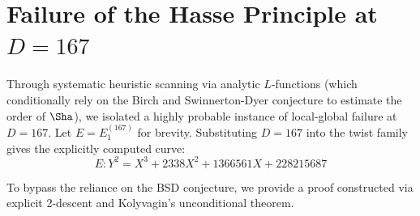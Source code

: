 \documentclass[11pt,a4paper]{article}
\begin{document}
\section{Failure of the Hasse Principle at \texorpdfstring{$D=167$}{D=167}}

Through systematic heuristic scanning via analytic $L$-functions (which conditionally rely on the Birch and Swinnerton-Dyer conjecture to estimate the order of $\Sha$), we isolated a highly probable instance of local-global failure at $D=167$. Let $E = E_1^{(167)}$ for brevity. Substituting $D=167$ into the twist family gives the explicitly computed curve:
$$E: Y^2 = X^3 + 2338X^2 + 1366561X + 228215687$$

To bypass the reliance on the BSD conjecture, we provide a proof constructed via explicit 2-descent and Kolyvagin's unconditional theorem.
\end{document}
